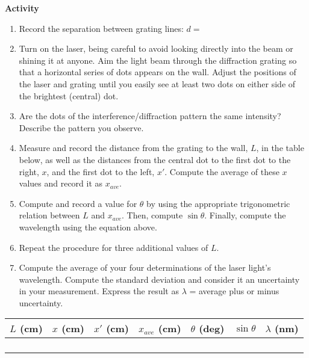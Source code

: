 \bigskip
\textbf{Activity}

\begin{enumerate}
\item Record the separation between grating lines: \( d= \)
\item Turn on the laser, being careful to avoid looking directly into the
beam or shining it at anyone. Aim the light beam through the diffraction
grating so that a horizontal series of dots appears on the wall. Adjust
the positions of the laser and grating until you easily see at least
two dots on either side of the brightest (central) dot.
\item Are the dots of the interference/diffraction pattern the same intensity?
Describe the pattern you observe.\vspace{15mm}

\item Measure and record the distance from the grating to the wall, $L$, in 
the table below, as well as the distances from the central dot to the first 
dot to the right, $x$, and the first dot to the left, $x'$. Compute the average
of these $x$ values and record it as $x_{ave}$.
\item Compute and record a value for $\theta$ by using the appropriate 
trigonometric relation between $L$ and $x_{ave}$. Then, compute $\sin \theta$. 
Finally, compute the wavelength using the equation above.
\item Repeat the procedure for three additional values of $L$.
\item Compute the average of your four determinations of the laser light's
wavelength. Compute the standard deviation and consider it an uncertainty in 
your measurement. Express the result as $\lambda$ = average plus or minus 
uncertainty.

\end{enumerate}
\vspace{15mm}
\begin{center}
\begin{tabular}{|c|c|c|c|c|c|c|}
\hline 
\( L \) (cm)&
\( x \) (cm)&
\( x' \) (cm)&
\( x_{ave} \) (cm)&
\( \theta  \) (deg)&
\( \sin \theta  \)&
\( \lambda  \) (nm)\\
\hline
\hline 
&
&
&
&
&
&
\\
\hline 
&
&
&
&
&
&
\\
\hline 
&
&
&
&
&
&
\\
\hline 
&
&
&
&
&
&
\\
\hline
\end{tabular}\vspace{0.3cm}

\end{center}

